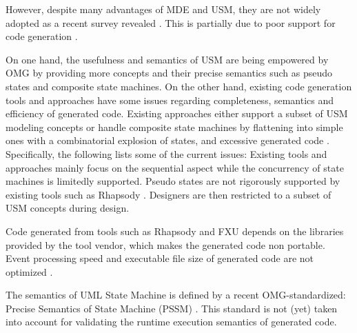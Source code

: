 However, despite many advantages of MDE and USM, they are not widely adopted as a recent survey revealed \cite{1030}.
This is partially due to poor support for code generation \cite{forward2010perceptions}.

On one hand, the usefulness and semantics of USM are being empowered by OMG by providing more concepts and their precise semantics such as pseudo states and composite state machines. 
On the other hand, existing code generation tools and approaches have some issues regarding completeness, semantics and efficiency of generated code. 
Existing approaches either support a subset of USM modeling concepts or handle composite state machines by flattening into simple ones with a combinatorial explosion of states, and excessive generated code \cite{badreddin2014enhanced}.
Specifically, the following lists some of the current issues: 
\vskip 0.1cm
\noindent
{} Existing tools and approaches mainly focus on the sequential aspect while the concurrency of state machines is limitedly supported. 
Pseudo states are not rigorously supported by existing tools such as Rhapsody 
	\cite{ibmdiff}.
Designers are then restricted to a subset of USM concepts during design.

\vskip 0.1cm
\noindent	
{} Code generated from tools such as Rhapsody \cite{ibm_rhapsody} and FXU \cite{Pilitowski2007} depends on the libraries provided by the tool vendor, which makes the generated code non portable. 
Event processing speed and executable file size of generated code are not optimized \cite{6195875}.
	
\vskip 0.1cm
\noindent
{} The semantics of UML State Machine is defined by a recent OMG-standardized: Precise Semantics of State Machine (PSSM) \cite{OMG2015}.
This standard is not (yet) taken into account for validating the runtime execution semantics of generated code. 

